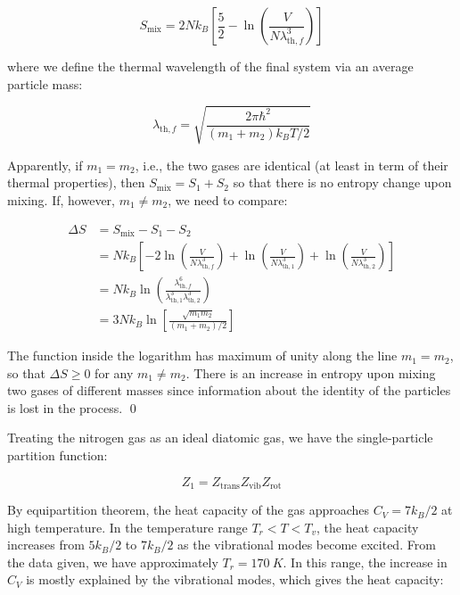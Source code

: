 \documentclass[12pt]{article}
\begin{document}
\begin{equation}
    S_{\text{mix}} = 2Nk_{B} \left[ \frac{5}{2} - \ln{\left( \frac{V}{N\lambda_{\text{th}, f}^{3}} \right)} \right]
\end{equation}

where we define the thermal wavelength of the final system via an average particle mass:

\begin{equation}
    \lambda_{\text{th}, f} = \sqrt{\frac{2\pi\hbar^{2}}{(m_{1} + m_{2}) k_{B}T/2}}
\end{equation}

Apparently, if $m_{1} = m_{2}$, i.e., the two gases are identical (at least in term of their thermal properties), then $S_{\text{mix}} = S_{1} + S_{2}$ so that there is no entropy change upon mixing. If, however, $m_{1} \neq m_{2}$, we need to compare:

\begin{equation}
    \begin{split}
        \Delta S &= S_{\text{mix}} - S_{1} - S_{2} \\
        &= Nk_{B} \left[ -2\ln{\left( \frac{V}{N\lambda_{\text{th}, f}^{3}} \right)} + \ln{\left( \frac{V}{N\lambda_{\text{th}, 1}^{3}} \right)} + \ln{\left( \frac{V}{N\lambda_{\text{th}, 2}^{3}} \right)} \right] \\
        &= Nk_{B} \ln{\left( \frac{\lambda_{\text{th}, f}^{6}}{\lambda_{\text{th}, 1}^{3}\lambda_{\text{th}, 2}^{3}} \right)} \\
        &= 3Nk_{B} \ln{\left[ \frac{\sqrt{m_{1}m_{2}}}{(m_{1} + m_{2})/2} \right]}
    \end{split}
\end{equation}

The function inside the logarithm has maximum of unity along the line $m_{1} = m_{2}$, so that $\Delta S \geq 0$ for any $m_{1} \neq m_{2}$. There is an increase in entropy upon mixing two gases of different masses since information about the identity of the particles is lost in the process.
\qed



Treating the nitrogen gas as an ideal diatomic gas, we have the single-particle partition function:

\begin{equation}
    Z_{1} = Z_{\text{trans}} Z_{\text{vib}} Z_{\text{rot}}
\end{equation}

By equipartition theorem, the heat capacity of the gas approaches $C_{V} = 7k_{B}/2$ at high temperature. In the temperature range $T_{r} < T < T_{v}$, the heat capacity increases from $5k_{B}/2$ to $7k_{B}/2$ as the vibrational modes become excited. From the data given, we have approximately $T_{r} = \qty{170}{K}$. In this range, the increase in $C_{V}$ is mostly explained by the vibrational modes, which gives the heat capacity:
\end{document}
